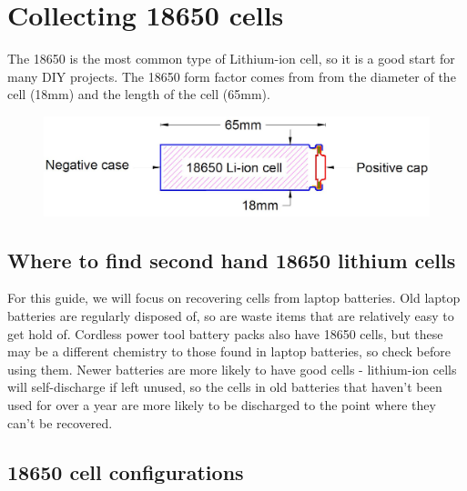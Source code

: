 \documentclass{article}
\theoremstyle{definition}
\theoremstyle{definition}
\theoremstyle{remark}
\begin{document}


\section{Collecting 18650 cells} %
\label{sec:collecting_18650_cells}

  The 18650 is the most common type of Lithium-ion cell, so it is a good start for many DIY projects. The 18650 form factor comes from from the diameter of the cell (18mm) and the length of the cell (65mm). 

  \begin{figure}[!ht]
    \centering
    \includegraphics[width=0.5\paperwidth]{Images/image_5_1_(cell_diagram).png}
  \end{figure}

  \subsection{Where to find second hand 18650 lithium cells} %
  \label{sub:where_to_find_second_hand_18650_lithium_cells}

    For this guide, we will focus on recovering cells from laptop batteries. Old laptop batteries are regularly disposed of, so are waste items that are relatively easy to get hold of. Cordless power tool battery packs also have 18650 cells, but these may be a different chemistry to those found in laptop batteries, so check before using them. Newer batteries are more likely to have good cells - lithium-ion cells will self-discharge if left unused, so the cells in old batteries that haven’t been used for over a year are more likely to be discharged to the point where they can’t be recovered.


  \subsection{18650 cell configurations} %
  \label{sub:18650_cell_configurations}
\end{document}
